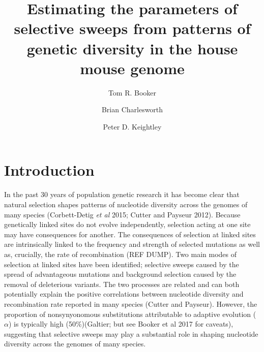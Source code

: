\documentclass[11pt]{article}
\title{\textbf{Estimating the parameters of selective sweeps from patterns of genetic diversity in the house mouse genome}}
\author[1,*]{Tom R. Booker}
\author[1]{Brian Charlesworth}
\author[1]{Peter D. Keightley}
\affil[1]{Institute of Evolutionary Biology, University of Edinburgh, Edinburgh}
\affil[*]{\emph{t.r.booker@sms.ed.ac.uk}}
\begin{document}
\maketitle
\begin{abstract}


\end{abstract}

%
%

\section*{Introduction}

In the past 30 years of population genetic research it has become clear that natural selection shapes patterns of nucleotide diversity across the genomes of many species (Corbett-Detig \textit{et al} 2015; Cutter and Payseur 2012). Because genetically linked sites do not evolve independently, selection acting at one site may have consequences for another. The consequences of selection at linked sites are intrinsically linked to the frequency and strength of selected mutations as well as, crucially, the rate of recombination (REF DUMP). Two main modes of selection at linked sites have been identified; selective sweeps caused by the spread of advantageous mutations and background selection caused by the removal of deleterious variants. The two processes are related and can both potentially explain the positive correlations between nucleotide diversity and recombination rate reported in many species (Cutter and Payseur). However, the proportion of nonsynyonomous substitutions attributable to adaptive evolution ($\alpha$) is typically high (50\%)(Galtier; but see Booker et al 2017 for caveats), suggesting that selective sweeps may play a substantial role in shaping nucleotide diversity across the genomes of many species.
\end{document}
